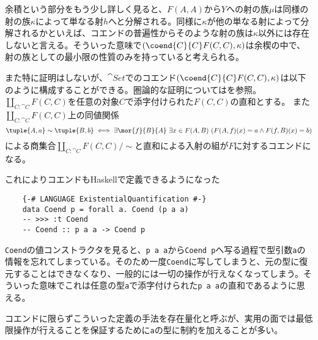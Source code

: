 \documentclass[uplatex,dvipdfmx]{jsarticle}
\newcommand{\pr}[1]{\colorbox[rgb]{0.9,0.9,0.9}{\lstinline{#1}}}
\begin{document}
  余積という部分をもう少し詳しく見ると、$F(A,A)$から$Y$への射の族$\mu$は同様の射の族$\kappa$によって単なる射$h$へと分解される。同様に$\kappa$が他の単なる射によって分解されるかといえば、コエンドの普遍性からそのような射の族は$\kappa$以外には存在しないと言える。そういった意味で$(\coend{C}{C} F(C,C),\kappa)$は余楔の中で、射の族としての最小限の性質のみを持っていると考えられる。
  
  また特に証明はしないが、$\cat{Set}$でのコエンド$(\coend{C}{C}F(C,C),\kappa)$は以下のように構成することができる。圏論的な証明については\cite{coend_calculus}を参照。
  $\coprod_{C:\cat{C}} F(C,C)$を任意の対象$C$で添字付けられた$F(C,C)$の直和とする。
  また$\coprod_{C:\cat{C}} F(C,C)$上の同値関係\[\tuple{A,a}\sim\tuple{B,b}\iff \exists \mor{f}{B}{A}\ \exists x\in F(A,B)\ (F(A,f)(x) = a \land F(f,B)(x) = b)\]による商集合$\coprod_{C:\cat{C}} F(C,C)/\sim$と直和による入射の組が$F$に対するコエンドになる。

  これによりコエンドもHaskellで定義できるようになった
  \begin{lstlisting}
    {-# LANGUAGE ExistentialQuantification #-}
    data Coend p = forall a. Coend (p a a)
    -- >>> :t Coend
    -- Coend :: p a a -> Coend p
  \end{lstlisting}
  \pr{Coend}の値コンストラクタを見ると、\pr{p a a}から\pr{Coend p}へ写る過程で型引数\pr{a}の情報を忘れてしまっている。そのため一度\pr{Coend}に写してしまうと、元の型に復元することはできなくなり、一般的には一切の操作が行えなくなってしまう。そういった意味でこれは任意の型\pr{a}で添字付けられた\pr{p a a}の直和であるように思える。

  コエンドに限らずこういった定義の手法を存在量化と呼ぶが、実用の面では最低限操作が行えることを保証するために\pr{a}の型に制約を加えることが多い。
\end{document}
